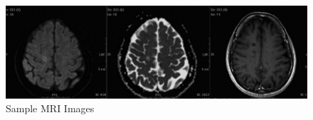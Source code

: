 \begin{figure}
    \centerline{\includegraphics[width=1\columnwidth]{02-related-works/figures/sample-mri-images.png}}
    \caption{Sample MRI Images \cite{lovblad2010mr}}
    \label{figure:sample-mri-images}
\end{figure}